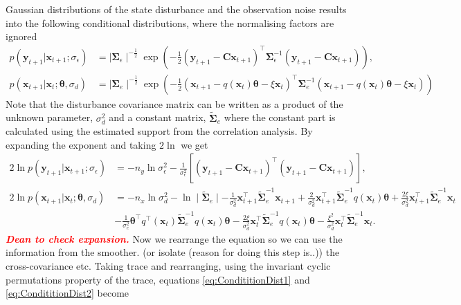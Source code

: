 \documentclass[]{article}
\newcommand{\dean}[1]{\textsf{\emph{\textbf{\textcolor{red}{#1}}}}}
\begin{document}
Gaussian distributions of the state disturbance and the observation noise results into the following conditional distributions, where the normalising factors are ignored 
\begin{align}
 p\left(\mathbf y_{t+1}|\mathbf x_{t+1};\sigma_{\epsilon}\right)&= \mid\boldsymbol\Sigma_{\epsilon}\mid^{-\frac{1}{2}}  \exp\left({-\frac{1}{2}\left(\mathbf y_{t+1}-\mathbf C\mathbf  x_{t+1}\right)^\top\boldsymbol\Sigma_{\epsilon}^{-1}\left(\mathbf y_{t+1}-\mathbf C\mathbf  x_{t+1}\right)}\right),\\
p(\mathbf x_{t+1}|\mathbf x_{t};\boldsymbol \theta ,\sigma_d)&= \mid\boldsymbol\Sigma_{e}\mid^{-\frac{1}{2}} \exp \left(-\frac{1}{2}(\mathbf x_{t+1}-q(\mathbf  x_t)\boldsymbol\theta-\xi  \mathbf x_t)^\top\boldsymbol\Sigma_e^{-1}(\mathbf x_{t+1}-q( \mathbf x_t)\boldsymbol\theta-\xi \mathbf  x_t) \right)
\end{align}
Note that the disturbance covariance matrix can be written as a product of the unknown parameter, $\sigma_d^2$ and a constant matrix, $\tilde{\boldsymbol\Sigma}_e$ where the constant part is calculated using the estimated support from the correlation analysis. By expanding the exponent and taking $2\ln$ we get
\begin{align}\label{eq:CondititionDist1}
2\ln p\left(\mathbf y_{t+1}|\mathbf x_{t+1};\sigma_{\epsilon}\right)&=-n_y\ln \sigma_{\epsilon}^2-\frac{1}{\sigma_{\epsilon}^2}\left[ (\mathbf y_{t+1}-\mathbf C\mathbf  x_{t+1})^\top(\mathbf y_{t+1}-\mathbf C\mathbf  x_{t+1})\right],  \\
2\ln p(\mathbf x_{t+1}|\mathbf x_{t};\boldsymbol \theta ,\sigma_d)&=-n_x\ln\sigma_d^2-\ln\mid\tilde{\boldsymbol\Sigma}_e\mid-\frac{1}{\sigma_d^2}\mathbf x_{t+1}^\top\tilde{\boldsymbol\Sigma}_e^{-1}\mathbf x_{t+1}+\frac{2}{\sigma_d^2}\mathbf x_{t+1}^\top\tilde{\boldsymbol\Sigma}_e^{-1}q( \mathbf x_t)\boldsymbol\theta+\frac{2\xi}{\sigma_d^2}\mathbf x_{t+1}^\top\tilde{\boldsymbol\Sigma}_e^{-1}\mathbf x_t \nonumber \\
&-\frac{1}{\sigma_e^2}\boldsymbol\theta^\top q^\top(\mathbf x_t)\tilde{\boldsymbol\Sigma}_e^{-1}q(\mathbf x_t)\boldsymbol\theta-\frac{2\xi}{\sigma_d^2} \mathbf x_t^\top\tilde{\boldsymbol\Sigma}_e^{-1}q(\mathbf x_t)\boldsymbol\theta-\frac{\xi^2}{\sigma_d^2}\mathbf x_t^\top\tilde{\boldsymbol\Sigma}_e^{-1}\mathbf x_t. \label{eq:CondititionDist2}
\end{align}
\dean{Dean to check expansion.} Now we rearrange the equation so we can  use the information from the smoother. (or isolate (reason for doing this step is..)) the cross-covariance etc. Taking trace and rearranging, using the invariant cyclic permutations property of the trace, equations \eqref{eq:CondititionDist1} and \eqref{eq:CondititionDist2} become
\end{document}
